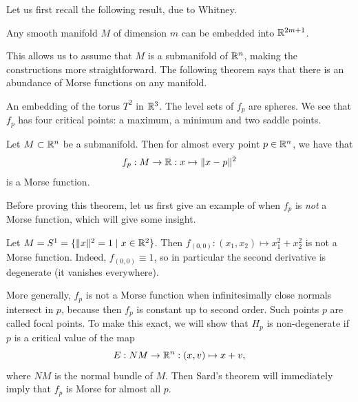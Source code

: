 Let us first recall the following result, due to Whitney.
\begin{theorem}
    Any smooth manifold $M$ of dimension $m$ can be embedded into  $\mathbb{R}^{2m+1}$.
\end{theorem}
This allows us to assume that $M$ is a submanifold of $\mathbb{R}^{n}$, making the constructions  more straightforward.
The following theorem says that there is an abundance of Morse functions on any manifold.
\begin{marginfigure}
    \centering
    \caption{An embedding of the torus $T^2$ in $\mathbb{R}^3$. The level sets of $f_p$ are spheres. We see that $f_p$ has four critical points: a maximum, a minimum and two saddle points.}
    \label{fig:level-sets-of-distance-function-torus}
\end{marginfigure}
\begin{prop}
    Let $M \subset \mathbb{R}^{n}$ be a submanifold.
    Then for almost every point $p \in \mathbb{R}^{n}$, we have that
    \[
    f_p : M \to \mathbb{R}: x \mapsto  \|x - p\|^2
    \] 
    is a Morse function.
\end{prop}


Before proving this theorem, let us first give an example of when $f_p$ is \emph{not} a Morse function, which will give some insight.

\begin{eg}
    Let $M = S^1 = \{\|x\|^2 = 1  \mid  x \in \mathbb{R}^2\} $.
    Then $f_{(0, 0)}:(x_1,x_2)\mapsto x_1^2 + x_2^2$ is not a Morse function.
    Indeed, $f_{(0, 0)} \equiv 1$, so in particular the second derivative is degenerate (it vanishes everywhere).
\end{eg}


More generally, $f_p$ is not a Morse function when infinitesimally close normals intersect in $p$, because then $f_p$ is constant up to second order.
Such points $p$ are called focal points.
To make this exact, we will show that $H_p$ is non-degenerate if $p$ is a critical value of the map
\[
    E: NM \to  \mathbb{R}^{n}: (x, v) \mapsto x + v
,\]
where $NM$ is the normal bundle of $M$.
Then Sard's theorem will immediately imply that $f_p$ is Morse for almost all $p$.

\begin{figure}[H]
    \centering
    \label{fig:existence-of-morse-functions-normal-bundle-map}
\end{figure}

